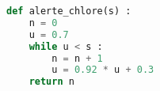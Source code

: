 \begin{center}
\begin{lstlisting}[language=python]
def alerte_chlore(s) :
	n = 0
	u = 0.7
	while u < s :
		n = n + 1
		u = 0.92 * u + 0.3
	return n
\end{lstlisting}
\end{center}